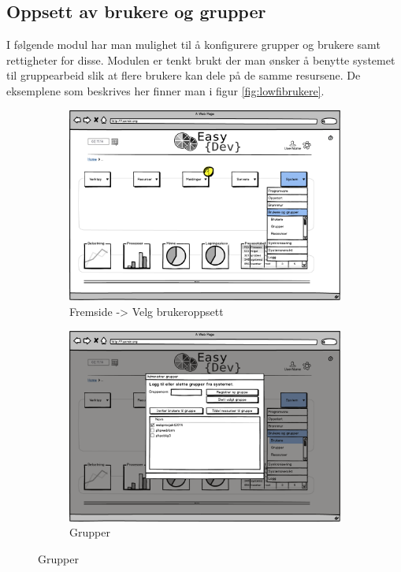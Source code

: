 \subsection{Oppsett av brukere og grupper}
I følgende modul har man mulighet til å konfigurere grupper og brukere samt rettigheter for disse. Modulen er tenkt brukt  der man ønsker å  benytte systemet til gruppearbeid slik at flere brukere kan dele på de samme resursene. De eksemplene som beskrives her finner man i figur \ref{fig:lowfibrukere}. 
\begin{figure}[h]
        \centering
        \begin{subfigure}[b]{0.48\textwidth}
                \includegraphics[width=\textwidth]
                {./img/prosessdokumentasjon/lowfi/b1.png}
                \caption{Fremside -> Velg brukeroppsett}
                \label{fig:brukere1}
        \end{subfigure}
        \begin{subfigure}[b]{0.48\textwidth}
                \includegraphics[width=\textwidth]
                {./img/prosessdokumentasjon/lowfi/b2.png}
                \caption{Grupper}
                \label{fig:brukere2}
        \end{subfigure}
        

\end{figure}
